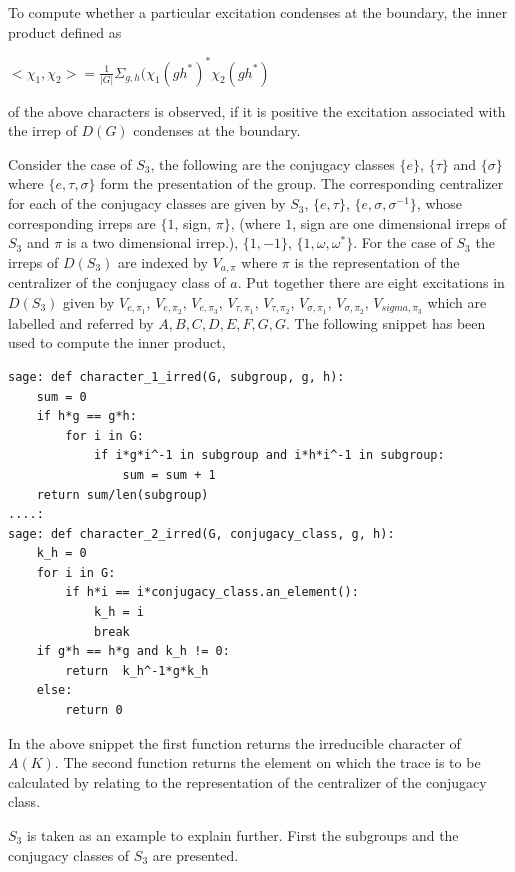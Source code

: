 To compute whether a particular excitation condenses at the boundary, the inner product defined as 
\begin{center}
 $<\chi_{1}, \chi_{2}> = \frac{1}{|G|} \varSigma_{g,h}(\chi_{1}(gh^{*})^{*}\chi_{2}(gh^{*})$
\end{center}
of the above characters is observed, if it is positive the excitation associated with the irrep of $D(G)$ condenses at the boundary.

Consider the case of $S_{3}$, the following are the conjugacy classes $\{e\}$, $\{\tau\}$ and $\{\sigma\}$ where $\{e, \tau, \sigma\}$ form the presentation of the group.
The corresponding centralizer for each of the conjugacy classes are given by $S_{3}$, $\{e, \tau\}$, $\{e, \sigma, \sigma^{-1}\}$, whose corresponding irreps are
$\{1$, sign, $\pi\}$, (where $1$, sign are one dimensional irreps of $S_{3}$ and $\pi$ is a two dimensional irrep.),  $\{1, -1\}$, $\{1, \omega, \omega^{*}\}$. For
the case of $S_{3}$ the irreps of $D(S_{3})$ are indexed by $V_{a, \pi}$ where $\pi$ is the representation of the centralizer of the conjugacy class of $a$.
Put together there are eight excitations in $D(S_{3})$ given by $V_{e, \pi_{1}}$, $V_{e, \pi_{2}}$, $V_{e, \pi_{3}}$, $V_{\tau, \pi_{1}}$, $V_{\tau, \pi_{2}}$, 
$V_{\sigma, \pi_{1}}$, $V_{\sigma, \pi_{2}}$, $V_{sigma, \pi_{3}}$ which are labelled and referred by $A, B, C, D, E, F, G, G$.
The following snippet has been used to compute the inner product, 
\begin{lstlisting}[frame=single]
sage: def character_1_irred(G, subgroup, g, h):
    sum = 0
    if h*g == g*h:
        for i in G:
            if i*g*i^-1 in subgroup and i*h*i^-1 in subgroup:
                sum = sum + 1
    return sum/len(subgroup)
....: 
sage: def character_2_irred(G, conjugacy_class, g, h):
    k_h = 0
    for i in G:
        if h*i == i*conjugacy_class.an_element():
            k_h = i
            break
    if g*h == h*g and k_h != 0:
        return  k_h^-1*g*k_h
    else:
        return 0
\end{lstlisting}

In the above snippet the first function returns the irreducible character of $A(K)$. The second function returns the element on which the trace is to be calculated by relating to
the representation of the centralizer of the conjugacy class. 

$S_{3}$ is taken as an example to explain further. First the subgroups and the conjugacy classes of $S_{3}$ are presented. 

